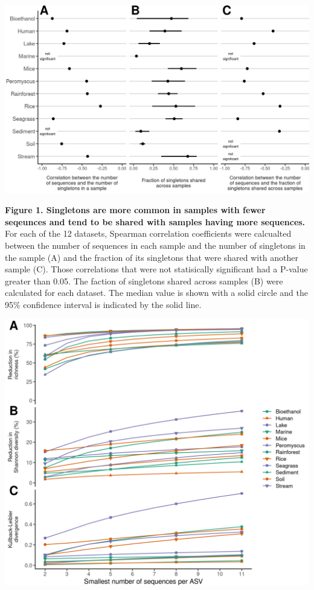 \documentclass[
]{article}
\begin{document}
\newpage

\includegraphics{figure_1.png}

\textbf{Figure 1. Singletons are more common in samples with fewer
seqeunces and tend to be shared with samples having more sequences.} For
each of the 12 datasets, Spearman correlation coefficients were
calcualted between the number of sequences in each sample and the number
of singletons in the sample (A) and the fraction of its singletons that
were shared with another sample (C). Those correlations that were not
statisically significant had a P-value greater than 0.05. The faction of
singletons shared across samples (B) were calculated for each dataset.
The median value is shown with a solid circle and the 95\% confidence
interval is indicated by the solid line.

\newpage

\includegraphics{figure_2.png}
\end{document}

